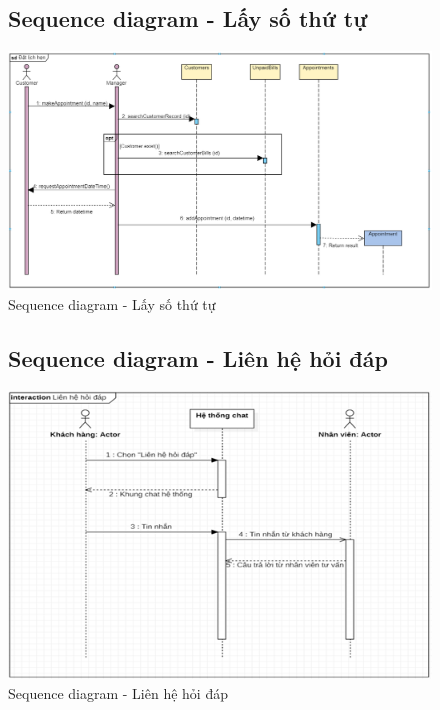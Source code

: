 \documentclass{report}
\begin{document}
\pagebreak
\begin{center}
	\begin{figure}[!htp]
		\subsection{Sequence diagram - Lấy số thứ tự}
		\begin{center}
			\includegraphics[scale=.5]{Hinh/Sequence diagram Lấy số thứ tự.png}
		\end{center}
		\caption{Sequence diagram - Lấy số thứ tự}
	\end{figure}
\end{center}


\pagebreak
\begin{center}
	\begin{figure}[!htp]
		\subsection{Sequence diagram - Liên hệ hỏi đáp}
		\begin{center}
			\includegraphics[scale=1]{Hinh/Sequence diagram Liên hệ hỏi đáp.png}
		\end{center}
		\caption{Sequence diagram - Liên hệ hỏi đáp}
	\end{figure}
\end{center}
\end{document}
